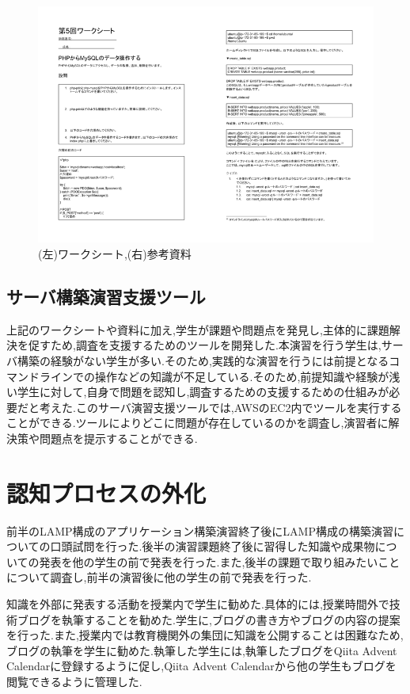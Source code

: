 \documentclass[11pt, a4paper]{jreport}
\begin{document}
\begin{figure}[H]
\begin{center}
\includegraphics[width=120mm]{./img/worksheet.png}
\caption{(左)ワークシート,(右)参考資料}
\label{fig:worksheet}
\end{center}
\end{figure}

\subsection{サーバ構築演習支援ツール}\label{grech}

上記のワークシートや資料に加え,学生が課題や問題点を発見し,主体的に課題解決を促すため,調査を支援するためのツール\cite{bib:servertool}を開発した.本演習を行う学生は,サーバ構築の経験がない学生が多い.そのため,実践的な演習を行うには前提となるコマンドラインでの操作などの知識が不足している.そのため,前提知識や経験が浅い学生に対して,自身で問題を認知し,調査するための支援するための仕組みが必要だと考えた.このサーバ演習支援ツールでは,AWSのEC2内でツールを実行することができる.ツールによりどこに問題が存在しているのかを調査し,演習者に解決策や問題点を提示することができる.

\section{認知プロセスの外化}

前半のLAMP構成のアプリケーション構築演習終了後にLAMP構成の構築演習についての口頭試問を行った.後半の演習課題終了後に習得した知識や成果物についての発表を他の学生の前で発表を行った.また,後半の課題で取り組みたいことについて調査し,前半の演習後に他の学生の前で発表を行った.

知識を外部に発表する活動を授業内で学生に勧めた.具体的には,授業時間外で技術ブログを執筆することを勧めた.学生に,ブログの書き方やブログの内容の提案を行った.また,授業内では教育機関外の集団に知識を公開することは困難なため,ブログの執筆を学生に勧めた.執筆した学生には,執筆したブログをQiita Advent Calendar\cite{bib:qiita}に登録するように促し,Qiita Advent Calendarから他の学生もブログを閲覧できるように管理した.
\end{document}
